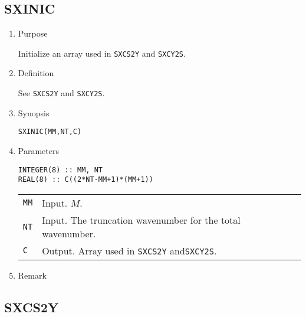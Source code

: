 \documentclass[a4paper]{scrartcl}
\begin{document}

\subsection{SXINIC}

\begin{enumerate}

\item Purpose 

Initialize an array used in \texttt{SXCS2Y} and \texttt{SXCY2S}.

\item Definition

See \texttt{SXCS2Y} and \texttt{SXCY2S}.

\item Synopsis 

\texttt{SXINIC(MM,NT,C)}
  
\item Parameters

\begin{verbatim}
INTEGER(8) :: MM, NT
REAL(8) :: C((2*NT-MM+1)*(MM+1))
\end{verbatim}

\begin{tabular}{ll}
\texttt{MM} & Input. $M$.\\  
\texttt{NT} & Input. The truncation wavenumber for the total wavenumber.\\
\texttt{C} & Output. Array used in \texttt{SXCS2Y} and\texttt{SXCY2S}.
\end{tabular}

\item Remark

\end{enumerate}


\subsection{SXCS2Y}
\end{document}
